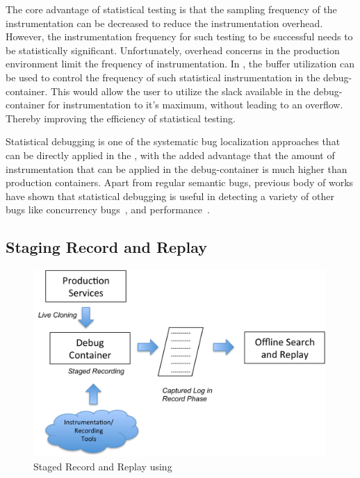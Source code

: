 The core advantage of statistical testing is that the sampling frequency of the instrumentation can be decreased to reduce the instrumentation overhead.
However, the instrumentation frequency for such testing to be successful needs to be statistically significant. 
Unfortunately, overhead concerns in the production environment limit the frequency of instrumentation.
In \parikshan, the buffer utilization can be used to control the frequency of such statistical instrumentation in the debug-container. 
This would allow the user to utilize the slack available in the debug-container for instrumentation to it's maximum, without leading to an overflow. 
Thereby improving the efficiency of statistical testing.

Statistical debugging is one of the systematic bug localization approaches that can be directly applied in the \debugcontainer, with the added advantage that the amount of instrumentation that can be applied in the debug-container is much higher than production containers. 
Apart from regular semantic bugs, previous body of works have shown that statistical debugging is useful in detecting a variety of other bugs like concurrency bugs~\cite{statisticalConcurrency}, and performance~\cite{statisticalPerformance}.

\subsection{Staging Record and Replay}
\label{sec:activeStagedRecordReplay}

\begin{figure}[h!]
	
	\centering
	\includegraphics[width=0.99\textwidth]{guided/figs/stagedRecordReplay.pdf}
	\caption{Staged Record and Replay using \parikshan}
	\label{fig:stagedRecordReplay}
\end{figure}

